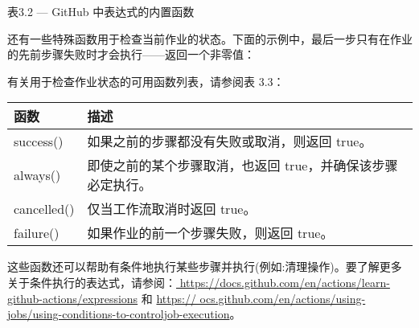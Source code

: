 \begin{center}
表3.2 --- GitHub 中表达式的内置函数
\end{center}


还有一些特殊函数用于检查当前作业的状态。下面的示例中，最后一步只有在作业的先前步骤失败时才会执行——返回一个非零值：


有关用于检查作业状态的可用函数列表，请参阅表 3.3：

\begin{longtable}[c]{|>{\centering\arraybackslash}p{3cm}|>{\centering\arraybackslash}p{12cm}|}
\hline
\textbf{函数} & \textbf{描述}                                   \\ \hline
\endfirsthead
%
\endhead
%
success() & 如果之前的步骤都没有失败或取消，则返回 true。                               \\ \hline
always()  & 即使之前的某个步骤取消，也返回 true，并确保该步骤必定执行。 \\ \hline
cancelled()       & 仅当工作流取消时返回 true。        \\ \hline
failure()         & 如果作业的前一个步骤失败，则返回 true。 \\ \hline
\end{longtable}

这些函数还可以帮助有条件地执行某些步骤并执行(例如:清理操作)。要了解更多关于条件执行的表达式，请参阅：\url{ https://docs.github.com/en/actions/learn-github-actions/expressions} 和 \url{https:// ocs.github.com/en/actions/using-jobs/using-conditions-to-controljob-execution}。




